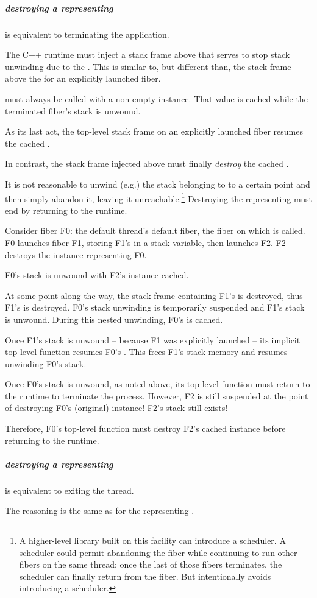 \subparagraph{destroying a \fiber representing \main}\label{destroymain} is equivalent to terminating the application.

The C++ runtime must inject a stack frame above \main that serves to stop
stack unwinding due to the \foreignex. This is similar to, but different than,
the stack frame above the \entryfn for an explicitly launched fiber.

\unwindfib must always be called with a non-empty \fiber instance. That \fiber
value is cached while the terminated fiber's stack is unwound.

As its last act, the top-level stack frame on an explicitly launched fiber
resumes the cached \fiber.

In contrast, the stack frame injected above \main must finally \emph{destroy}
the cached \fiber.

It is not reasonable to unwind (e.g.) the stack belonging to \main to a
certain point and then simply abandon it, leaving it unreachable.\footnote{A
higher-level library built on this facility can introduce a scheduler. A
scheduler could permit abandoning the \main fiber while continuing to run
other fibers on the same thread; once the last of those fibers terminates, the
scheduler can finally return from the \main fiber. But \fiber intentionally
avoids introducing a scheduler.} Destroying the \fiber representing \main must
end by returning to the runtime.

Consider fiber F0: the default thread's default fiber, the fiber on
which \main is called. F0 launches fiber F1, storing F1's \fiber in a
stack variable, then launches F2. F2 destroys the \fiber instance representing
F0.

F0's stack is unwound with F2's \fiber instance cached.

At some point along the way, the stack frame containing F1's \fiber is
destroyed, thus F1's \fiber is destroyed. F0's stack unwinding is temporarily
suspended and F1's stack is unwound. During this nested unwinding, F0's \fiber
is cached.

Once F1's stack is unwound -- because F1 was explicitly launched -- its
implicit top-level function resumes F0's \fiber. This frees F1's stack memory
and resumes unwinding F0's stack.

Once F0's stack is unwound, as noted above, its top-level function must return
to the runtime to terminate the process. However, F2 is still suspended at the
point of destroying F0's (original) \fiber instance! F2's stack still exists!

Therefore, F0's top-level function must destroy F2's cached \fiber instance
before returning to the runtime.

\subparagraph{destroying a \fiber representing } is
equivalent to exiting the thread.

The reasoning is the same as for the \fiber representing \main.


